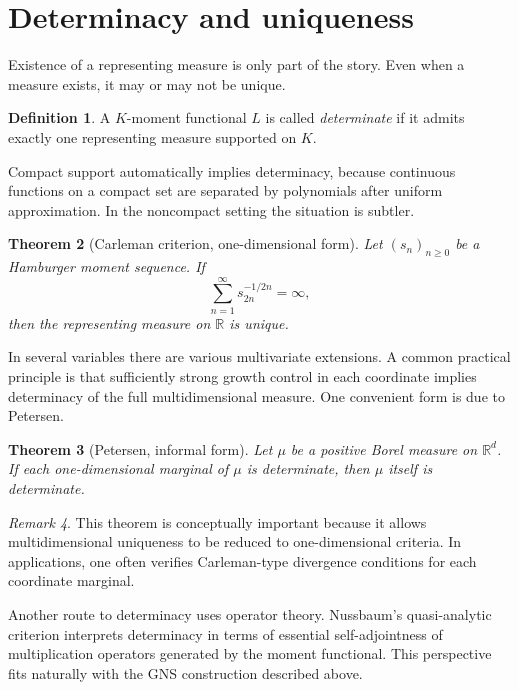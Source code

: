 \documentclass[11pt]{amsart}
\numberwithin{equation}{section}
\newtheorem{theorem}{Theorem}[section]
\theoremstyle{definition}
\newtheorem{definition}[theorem]{Definition}
\theoremstyle{remark}
\newtheorem{remark}[theorem]{Remark}
\newcommand{\R}{\mathbb{R}}
\newcommand{\1}{\mathbf{1}}
\begin{document}
\section{Determinacy and uniqueness}\label{sec:determinacy}

Existence of a representing measure is only part of the story. Even when a measure exists, it may or may not be unique.

\begin{definition}
A \(K\)-moment functional \(L\) is called \emph{determinate} if it admits exactly one representing measure supported on \(K\).
\end{definition}

Compact support automatically implies determinacy, because continuous functions on a compact set are separated by polynomials after uniform approximation. In the noncompact setting the situation is subtler.

\begin{theorem}[Carleman criterion, one-dimensional form]\label{thm:carleman}
Let \((s_n)_{n\ge 0}\) be a Hamburger moment sequence. If
\[
\sum_{n=1}^{\infty} s_{2n}^{-1/2n}=\infty,
\]
then the representing measure on \(\R\) is unique.
\end{theorem}

In several variables there are various multivariate extensions. A common practical principle is that sufficiently strong growth control in each coordinate implies determinacy of the full multidimensional measure. One convenient form is due to Petersen.

\begin{theorem}[Petersen, informal form]\label{thm:petersen}
Let \(\mu\) be a positive Borel measure on \(\R^d\). If each one-dimensional marginal of \(\mu\) is determinate, then \(\mu\) itself is determinate.
\end{theorem}

\begin{remark}
This theorem is conceptually important because it allows multidimensional uniqueness to be reduced to one-dimensional criteria. In applications, one often verifies Carleman-type divergence conditions for each coordinate marginal.
\end{remark}

Another route to determinacy uses operator theory. Nussbaum's quasi-analytic criterion interprets determinacy in terms of essential self-adjointness of multiplication operators generated by the moment functional. This perspective fits naturally with the GNS construction described above.
\end{document}
